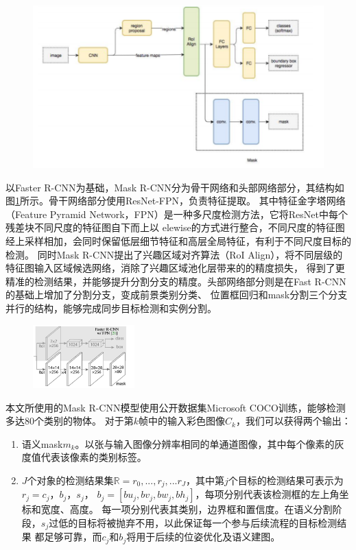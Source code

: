 \begin{figure}[!htbp]
    \centering
    \includegraphics[width=\textwidth]{Img/2-maskRCNNStructure.png}
    \label{fig:maskRCNNStructure}
\end{figure}
以Faster R-CNN为基础，Mask R-CNN分为骨干网络和头部网络部分，其结构如图\ref{fig:maskRCNNStructure}所示。骨干网络部分使用ResNet-FPN\citep{he2016deep}，负责特征提取。
其中特征金字塔网络（Feature Pyramid Network，FPN）是一种多尺度检测方法，它将ResNet中每个残差块不同尺度的特征图自下而上以
elewise的方式进行整合，不同尺度的特征图经上采样相加，会同时保留低层细节特征和高层全局特征，有利于不同尺度目标的检测。
同时Mask R-CNN提出了兴趣区域对齐算法（RoI Align），将不同层级的特征图输入区域候选网络，消除了兴趣区域池化层带来的的精度损失，
得到了更精准的检测结果，并能够提升分割分支的精度。头部网络部分则是在Fast R-CNN的基础上增加了分割分支，变成前景类别分类、
位置框回归和mask分割三个分支并行的结构，能够完成同步目标检测和实例分割。
\begin{figure}[!htbp]
    \centering
    \includegraphics[width=0.35\textwidth]{Img/2-headNetwork.png}
    \label{fig:headNetwork}
\end{figure}
本文所使用的Mask R-CNN模型使用公开数据集Microsoft COCO\citep{lin2014microsoft}训练，能够检测多达80个类别的物体。
对于第$k$帧中的输入彩色图像$C_{k}$，我们可以获得两个输出：
{
\setlist[enumerate]{}%
\begin{enumerate}[nosep]
    \item 语义mask$m_{k}$。以张与输入图像分辨率相同的单通道图像，其中每个像素的灰度值代表该像素的类别标签。
    \item $J$个对象的检测结果集$\mathbb{R}={r_{0},...,r_{j},...r_{J}} $，其中第$j$个目标的检测结果可表示为$r_{j}={c_{j}，b_{j}，s_{j}}$，
    $b_{j}=\left[bu_{j},bv_{j},bw_{j},bh_{j}\right]$，每项分别代表该检测框的左上角坐标和宽度、高度。
    每一项分别代表其类别，边界框和置信度。在语义分割阶段，$s_{j}$过低的目标将被抛弃不用，以此保证每一个参与后续流程的目标检测结果
    都足够可靠，而$c_{j}$和$b_{j}$将用于后续的位姿优化及语义建图。
\end{enumerate}
}

